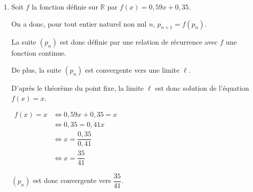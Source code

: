 \documentclass[10pt]{article}
\providecommand{\R}{\mathbb{R}}
\begin{document}
\begin{enumerate}
	De plus, $p_n$ est égal une  probabilité donc $p_n \geqslant 0$, la suite $(p_{n})$ est donc minorée par 0. 
	
Donc la suite $(p_{n})$ est convergente vers une limite $\ell$. 
	
	\item   Soit $f$ la fonction définie sur $\R$ par $f(x) =0,59x+0,35$. 
	
	On a donc, pour tout entier naturel non nul  $n$, $p_{n+1}=f(p_n)$.
	
	La suite $(p_{n})$ est donc définie par une relation de récurrence  avec $f$  une fonction continue.
	
	De plus, la suite $(p_{n})$ est convergente vers une limite $\ell$.
	
	D'après le théorème du point fixe, la limite $\ell$ est donc solution de l'équation $f(x)=x$. 
	
	
	$\begin{aligned}  f(x)=x &\iff 0,59 x +0,35 = x \\
		&\iff 0,35 = 0,41x \\
	&	\iff x= \dfrac{0,35}{0,41}\\
	&\iff x = \dfrac{35}{41}
		\end{aligned}$
	
	
	$(p_n)$ est donc convergente vers  $\dfrac{35}{41}$. 
\end{enumerate}
\end{document}
